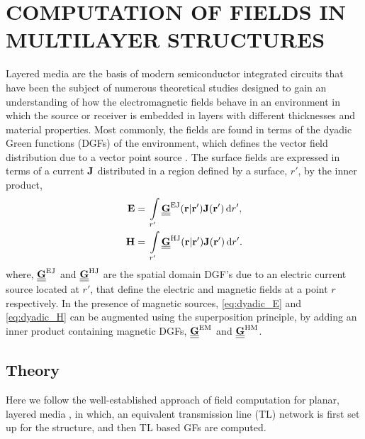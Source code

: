 \chapter{\uppercase{Computation of fields in multilayer structures}}
%

Layered media are the basis of modern semiconductor integrated circuits that have been the subject of numerous theoretical studies designed to gain an understanding of how the electromagnetic fields behave in an environment in which the source or receiver is embedded in layers with different thicknesses and material properties. Most commonly, the fields are found in terms of the dyadic Green functions (DGFs) of the environment, which defines the vector field distribution due to a vector point source \cite{Bladel2007}. The surface fields are expressed in terms of a current $\mathbf{J}$ distributed in a region defined by a surface, $r'$, by the inner product,
%
\begin{subequations}
  \begin{align}
    \mathbf{E} ={}& \int\limits_{r'} \underline{\underline{\mathbf{G}}}^\mathrm{EJ}(\mathbf{r} | \mathbf{r'}) \mathbf{J}(\mathbf{r'}) \mathop{}\!\mathrm{d}{r'},
    \label{eq:dyadic_E}\\
    \mathbf{H} ={}& \int\limits_{r'} \underline{\underline{\mathbf{G}}}^\mathrm{HJ}(\mathbf{r} | \mathbf{r'}) \mathbf{J}(\mathbf{r'}) \mathop{}\!\mathrm{d}{r'}.
    \label{eq:dyadic_H}
  \end{align}
  \label{eq:dyadic}%
\end{subequations}
where, $\underline{\underline{\mathbf{G}}}^\mathrm{EJ}$ and $\underline{\underline{\mathbf{G}}}^\mathrm{HJ}$ are the spatial domain DGF's due to an electric current source located at $r'$, that define the electric and magnetic fields at a point $r$ respectively. In the presence of magnetic sources, \eqref{eq:dyadic_E} and \eqref{eq:dyadic_H} can be augmented using the superposition principle, by adding an inner product containing magnetic DGFs, $\underline{\underline{\mathbf{G}}}^\mathrm{EM}$ and
$\underline{\underline{\mathbf{G}}}^\mathrm{HM}$.
\section{Theory}
%
Here we follow the well-established approach of field computation for planar, layered media \cite{Michalski2005,Michalski1997}, in which, an equivalent transmission line (TL) network is first set up for the structure, and then TL based GFs are computed.
